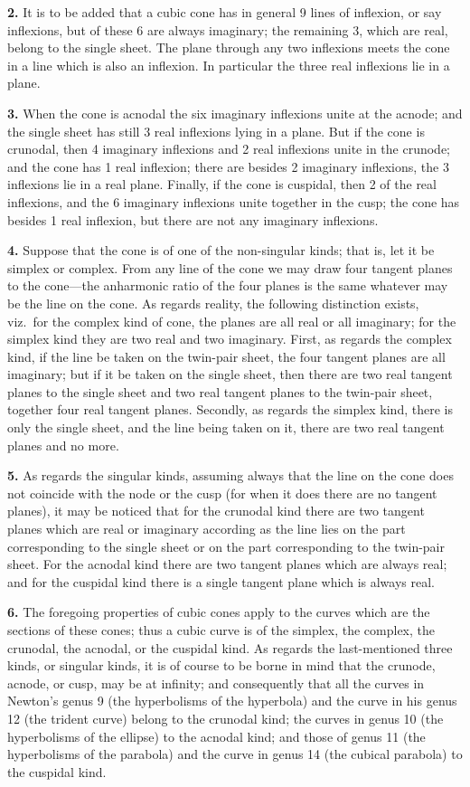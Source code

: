 \documentclass[11pt,a4paper]{article}
\begin{document}
\textbf{2.} It is to be added that a cubic cone has in general 9 lines of inflexion, or say inflexions, but of these 6 are always imaginary; the remaining 3, which are real, belong to the single sheet. The plane through any two inflexions meets the cone in a line which is also an inflexion. In particular the three real inflexions lie in a plane.

\textbf{3.} When the cone is acnodal the six imaginary inflexions unite at the acnode; and the single sheet has still 3 real inflexions lying in a plane. But if the cone is crunodal, then 4 imaginary inflexions and 2 real inflexions unite in the crunode; and the cone has 1 real inflexion; there are besides 2 imaginary inflexions, the 3 inflexions lie in a real plane. Finally, if the cone is cuspidal, then 2 of the real inflexions, and the 6 imaginary inflexions unite together in the cusp; the cone has besides 1 real inflexion, but there are not any imaginary inflexions.

\textbf{4.} Suppose that the cone is of one of the non-singular kinds; that is, let it be simplex or complex. From any line of the cone we may draw four tangent planes to the cone---the anharmonic ratio of the four planes is the same whatever may be the line on the cone. As regards reality, the following distinction exists, viz.\ for the complex kind of cone, the planes are all real or all imaginary; for the simplex kind they are two real and two imaginary. First, as regards the complex kind, if the line be taken on the twin-pair sheet, the four tangent planes are all imaginary; but if it be taken on the single sheet, then there are two real tangent planes to the single sheet and two real tangent planes to the twin-pair sheet, together four real tangent planes. Secondly, as regards the simplex kind, there is only the single sheet, and the line being taken on it, there are two real tangent planes and no more.

\textbf{5.} As regards the singular kinds, assuming always that the line on the cone does not coincide with the node or the cusp (for when it does there are no tangent planes), it may be noticed that for the crunodal kind there are two tangent planes which are real or imaginary according as the line lies on the part corresponding to the single sheet or on the part corresponding to the twin-pair sheet. For the acnodal kind there are two tangent planes which are always real; and for the cuspidal kind there is a single tangent plane which is always real.

\textbf{6.} The foregoing properties of cubic cones apply to the curves which are the sections of these cones; thus a cubic curve is of the simplex, the complex, the crunodal, the acnodal, or the cuspidal kind. As regards the last-mentioned three kinds, or singular kinds, it is of course to be borne in mind that the crunode, acnode, or cusp, may be at infinity; and consequently that all the curves in Newton's genus 9 (the hyperbolisms of the hyperbola) and the curve in his genus 12 (the trident curve) belong to the crunodal kind; the curves in genus 10 (the hyperbolisms of the ellipse) to the acnodal kind; and those of genus 11 (the hyperbolisms of the parabola) and the curve in genus 14 (the cubical parabola) to the cuspidal kind.
\end{document}
